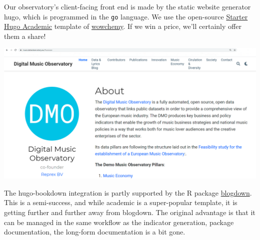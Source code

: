 \documentclass[
  a4paper,
  openany, a4paper, oneside]{book}
\begin{document}
Our observatory's client-facing front end is made by the static website generator hugo, which is programmed in the \texttt{go} language. We use the open-source \href{https://github.com/wowchemy/starter-hugo-academic}{Starter Hugo Academic} template of \href{https://wowchemy.com/docs/getting-started/page-builder/}{wowchemy}. If we win a price, we'll certainly offer them a share!

\begin{center}\includegraphics[width=26.25in]{plots/screenshots/dmo_opening_screen} \end{center}

The hugo-bookdown integration is partly supported by the R package \href{https://bookdown.org/yihui/blogdown/}{blogdown}. This is a semi-success, and while academic is a super-popular template, it is getting further and further away from blogdown. The original advantage is that it can be managed in the same workflow as the indicator generation, package documentation, the long-form documentation is a bit gone.
\end{document}

